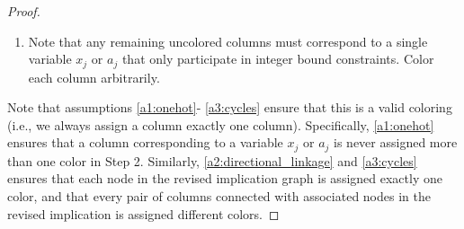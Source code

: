 \begin{proof}
\begin{enumerate}

\item Note that any remaining uncolored columns must correspond to a single variable $x_j$ or $a_j$ that only participate in integer bound constraints. Color each column arbitrarily.
\end{enumerate}


Note that assumptions \ref{a1:onehot}- \ref{a3:cycles} ensure that this is a valid coloring (i.e., we always assign a column exactly one column). Specifically, \cref{a1:onehot} ensures that a column corresponding to a variable $x_j$ or $a_j$ is never assigned more than one color in Step 2. Similarly, \cref{a2:directional_linkage} and \cref{a3:cycles} ensures that each node in the revised implication graph is assigned exactly one color, and that every pair of columns connected with associated nodes in the revised implication is assigned different colors.


\end{proof}
